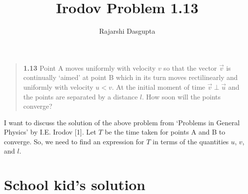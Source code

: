 \documentclass{article}
\title{Irodov Problem 1.13}
\author{Rajarshi Dasgupta}
\begin{document}
\maketitle

\begin{quote}
	{ \bf 1.13 }
	Point A moves uniformly with velocity $v$
	so that the vector $\vec{v}$
	is continually `aimed' at point B
	which in its turn moves rectilinearly and uniformly
	with velocity $u < v$.
	At the initial moment of time $\vec{v} \perp \vec{u}$
	and the points are separated by a distance $l$.
	How soon will the points converge?
\end{quote}
I want to discuss the solution of the above problem
from `Problems in General Physics'
by I.E. Irodov [1]. %
Let $T$ be the time taken for points A and B to converge.
So, we need to find an expression for $T$
in terms of the quantities $u$, $v$, and $l$.

\section{School kid's solution}
\end{document}
